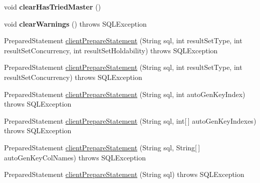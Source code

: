 \begin{DoxyCompactItemize}
\mbox{\label{classcom_1_1mysql_1_1cj_1_1jdbc_1_1ha_1_1_multi_host_my_s_q_l_connection_a1de3c2673c06d90de1baee65b7607ef0}} 
void {\bfseries clear\+Has\+Tried\+Master} ()
\item 
\mbox{\label{classcom_1_1mysql_1_1cj_1_1jdbc_1_1ha_1_1_multi_host_my_s_q_l_connection_a2b18d0742519558ab0680c7c137722a1}} 
void {\bfseries clear\+Warnings} ()  throws S\+Q\+L\+Exception 
\item 
Prepared\+Statement \mbox{\hyperlink{classcom_1_1mysql_1_1cj_1_1jdbc_1_1ha_1_1_multi_host_my_s_q_l_connection_a90d99874278a283359f65712794b4524}{client\+Prepare\+Statement}} (String sql, int result\+Set\+Type, int result\+Set\+Concurrency, int result\+Set\+Holdability)  throws S\+Q\+L\+Exception 
\item 
Prepared\+Statement \mbox{\hyperlink{classcom_1_1mysql_1_1cj_1_1jdbc_1_1ha_1_1_multi_host_my_s_q_l_connection_aa2b134c582c04c7016ffa481a25d4e18}{client\+Prepare\+Statement}} (String sql, int result\+Set\+Type, int result\+Set\+Concurrency)  throws S\+Q\+L\+Exception 
\item 
Prepared\+Statement \mbox{\hyperlink{classcom_1_1mysql_1_1cj_1_1jdbc_1_1ha_1_1_multi_host_my_s_q_l_connection_a384dc86ad7784b2b6f87d74e9242e248}{client\+Prepare\+Statement}} (String sql, int auto\+Gen\+Key\+Index)  throws S\+Q\+L\+Exception 
\item 
Prepared\+Statement \mbox{\hyperlink{classcom_1_1mysql_1_1cj_1_1jdbc_1_1ha_1_1_multi_host_my_s_q_l_connection_ac3338beff85b1b1704e87f67b643eeaa}{client\+Prepare\+Statement}} (String sql, int\mbox{[}$\,$\mbox{]} auto\+Gen\+Key\+Indexes)  throws S\+Q\+L\+Exception 
\item 
Prepared\+Statement \mbox{\hyperlink{classcom_1_1mysql_1_1cj_1_1jdbc_1_1ha_1_1_multi_host_my_s_q_l_connection_af7a6412387f62b55132775c5f9700fd9}{client\+Prepare\+Statement}} (String sql, String\mbox{[}$\,$\mbox{]} auto\+Gen\+Key\+Col\+Names)  throws S\+Q\+L\+Exception 
\item 
Prepared\+Statement \mbox{\hyperlink{classcom_1_1mysql_1_1cj_1_1jdbc_1_1ha_1_1_multi_host_my_s_q_l_connection_aad5b9594841a4c935130b225d0c3d686}{client\+Prepare\+Statement}} (String sql)  throws S\+Q\+L\+Exception 
\item 
\mbox{\label{classcom_1_1mysql_1_1cj_1_1jdbc_1_1ha_1_1_multi_host_my_s_q_l_connection_a395d1a2ad3c87af7cc97a6a516b601f2}} 

\end{DoxyCompactItemize}
